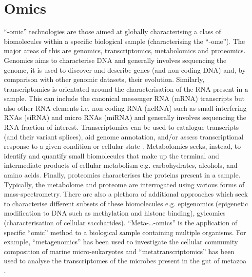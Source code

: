 \section{Omics}
``-omic'' technologies are those aimed at globally characterising a class of biomolecules 
within a specific biological sample (characterising the ``-ome''). The major areas of this
are genomics, transcriptomics, metabolomics and proteomics. 
Genomics aims to characterise DNA and generally involves sequencing the genome, it is used
to discover and describe genes (and non-coding DNA) and, by comparison with other genomic
datasets, their evolution.  Similarly, transcriptomics is orientated 
around the characterisation of the RNA present in a sample.  This can include
the canonical messenger RNA (mRNA) transcripts but also other RNA elements i.e.
non-coding RNA (ncRNA) such as small interfering RNAs (siRNA) and micro RNAs (miRNA) and
generally involves sequencing the RNA fraction of interest.
Transcriptomics can be used to catalogue transcripts (and their variant splices), 
aid genome annotation,  and/or assess transcriptional response to a given condition or cellular state \citep{Wang2009}.
Metabolomics seeks, instead, to identify and quantify small biomolecules that make up the terminal and
intermediate products of cellular metabolism e.g. carbohydrates, alcohols, and amino acids.  
Finally, proteomics characterises the proteins present in a sample. 
Typically, the metabolome and proteome are interrogated using various forms of mass-spectrometry.
There are also a plethora of additional approaches which seek to characterise
different subsets of these biomolecules e.g. epigenomics (epigenetic modification to DNA such as methylation
and histone binding), gylcomics (characterisation of cellular saccharides).
``Meta-\ldots-omics'' is the application of specific ``omic'' method to a biological sample 
containing multiple organisms. For example, ``metagenomics'' has been used to investigate
the cellular community composition of marine micro-eukaryotes \citep{Cuvelier2010}
and ``metatranscriptomics'' has been used to analyse the transcriptomes of the microbes present in the gut of metazoa \citep{Perez-Cobas2013}.

